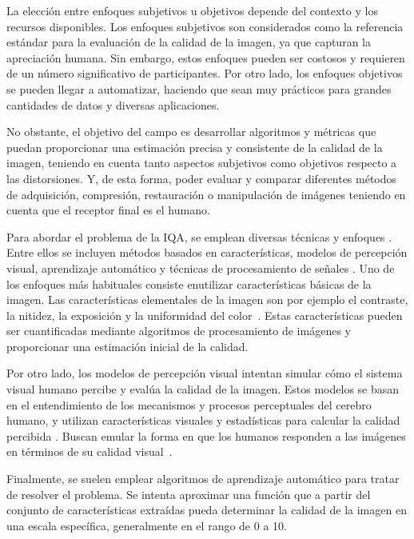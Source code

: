 La elección entre enfoques subjetivos u objetivos depende del contexto y los 
recursos disponibles. Los enfoques subjetivos son considerados como la referencia estándar 
para la evaluación de la calidad de la imagen, ya que capturan la apreciación 
humana. Sin embargo, estos enfoques pueden ser costosos y requieren de un número 
significativo de participantes. 
Por otro lado, los enfoques objetivos se pueden llegar a automatizar, haciendo que 
sean muy prácticos para grandes cantidades de datos y diversas aplicaciones.
 
No obstante, el objetivo del campo es desarrollar algoritmos y métricas que puedan proporcionar una 
estimación precisa y consistente de la calidad de la imagen, teniendo en cuenta
tanto aspectos subjetivos como objetivos respecto a las distorsiones.
Y, de esta forma, poder evaluar y comparar diferentes métodos de adquisición, compresión, 
restauración o manipulación de imágenes teniendo en cuenta que el receptor 
final es el humano.
 
Para abordar el problema de la IQA, se emplean diversas técnicas y enfoques
\cite{MinkowskiFailure, Wang2006ModernIQ, VisualMedicalQualityBook}.
Entre ellos se incluyen métodos basados en características,
modelos de percepción visual, aprendizaje automático y técnicas de procesamiento de señales
\cite{SSIM, MMF, DSS}.
Uno de los enfoques más habituales consiste enutilizar características básicas de la imagen. 
Las características elementales de la imagen son por ejemplo el contraste, 
la nitidez, la exposición y la uniformidad del color~\cite{MinkowskiFailure,Wang2006ModernIQ}. 
Estas características pueden ser cuantificadas mediante algoritmos de procesamiento de 
imágenes y proporcionar una estimación inicial de la calidad. 
 
Por otro lado, los modelos de percepción visual intentan simular cómo el sistema 
visual humano percibe y evalúa la calidad de la imagen. Estos modelos se basan 
en el entendimiento de los mecanismos y procesos perceptuales del cerebro humano, 
y utilizan características visuales y estadísticas para calcular la calidad percibida
\cite{MinkowskiFailure, SSIM}.
Buscan emular la forma en que los humanos responden 
a las imágenes en términos de su calidad visual~\cite{VSI, CascadedIQA}.
 
Finalmente, se suelen emplear algoritmos de aprendizaje automático para tratar
de resolver el problema. Se intenta aproximar una función que a partir del conjunto 
de características extraídas pueda determinar la calidad de la imagen en una escala 
específica, generalmente en el rango de 0 a 10.

